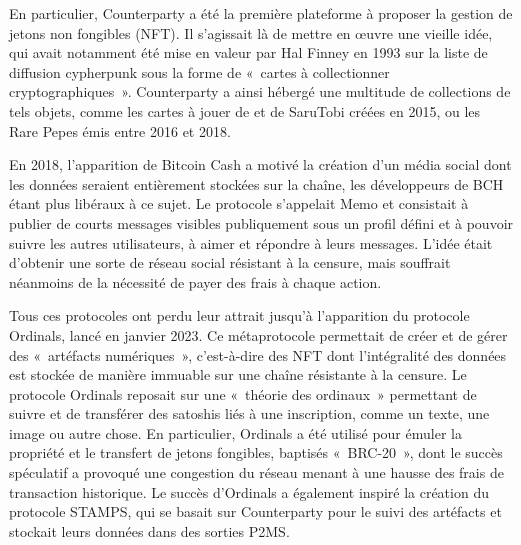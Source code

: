 En particulier, Counterparty a été la première plateforme à proposer la gestion de jetons non fongibles (NFT). Il s'agissait là de mettre en œuvre une vieille idée, qui avait notamment été mise en valeur par Hal Finney en 1993 sur la liste de diffusion cypherpunk sous la forme de «~cartes à collectionner cryptographiques~». Counterparty a ainsi hébergé une multitude de collections de tels objets, comme les cartes à jouer de  et de SaruTobi créées en 2015, ou les Rare Pepes émis entre 2016 et 2018.

En 2018, l'apparition de Bitcoin Cash a motivé la création d'un média social dont les données seraient entièrement stockées sur la chaîne, les développeurs de BCH étant plus libéraux à ce sujet. Le protocole s'appelait Memo et consistait à publier de courts messages visibles publiquement sous un profil défini et à pouvoir suivre les autres utilisateurs, à aimer et répondre à leurs messages. L'idée était d'obtenir une sorte de réseau social résistant à la censure, mais souffrait néanmoins de la nécessité de payer des frais à chaque action. 

Tous ces protocoles ont perdu leur attrait jusqu'à l'apparition du protocole Ordinals, lancé en janvier 2023. Ce métaprotocole permettait de créer et de gérer des «~artéfacts numériques~», c'est-à-dire des NFT dont l'intégralité des données est stockée de manière immuable sur une chaîne résistante à la censure. Le protocole Ordinals reposait sur une «~théorie des ordinaux~» permettant de suivre et de transférer des satoshis liés à une inscription, comme un texte, une image ou autre chose. En particulier, Ordinals a été utilisé pour émuler la propriété et le transfert de jetons fongibles, baptisés «~BRC-20~», dont le succès spéculatif a provoqué une congestion du réseau menant à une hausse des frais de transaction historique. Le succès d'Ordinals a également inspiré la création du protocole STAMPS, qui se basait sur Counterparty pour le suivi des artéfacts et stockait leurs données dans des sorties P2MS.

